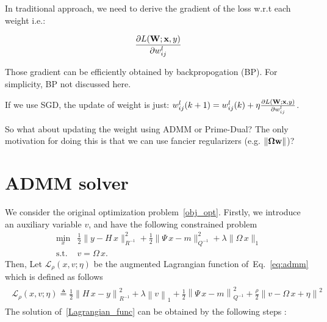 \documentclass[11pt,a4paper]{article}
\begin{document}
In traditional approach, we need to derive the gradient of the loss w.r.t each weight i.e.:

\begin{equation}
\frac{\partial L(\mathbf{W}; \mathbf{x}, y)}{\partial w^l_{ij}}
\end{equation}

Those gradient can be efficiently obtained by backpropogation (BP). For simplicity, BP not discussed here. 

If we use SGD, the update of weight is just: $w^l_{ij}(k+1) = w^l_{ij}(k) + \eta \frac{\partial L(\mathbf{W}; \mathbf{x}, y)}{\partial w^l_{ij}}$.

So what about updating the weight using ADMM or Prime-Dual? The only motivation for doing this is that we can use fancier regularizers (e.g. $\lVert\bm{\Omega} \mathbf{w}\rVert$)?

\section{ADMM solver}
We consider the original optimization problem~\eqref{obj_opt}. Firstly, we introduce an auxiliary variable $v$, and have the following constrained problem  
\begin{equation}\label{eq:admm}
\begin{split}
\min_{x} &\frac{1}{2} \| y - H \, x \|^2_{R^{-1}}
   + \frac{1}{2} \| \Psi \, x - m \|^2_{Q^{-1}} 
   + \lambda \|\Omega\, x \|_1  \\
\mathrm{s.t.}\ & v = \Omega\,x . 
\end{split}
\end{equation}
Then, Let $\mathcal{L_\rho}(x,v;\eta)$ be the augmented Lagrangian function of~Eq.~\eqref{eq:admm} which is defined as follows
\begin{equation}\label{Lagrangian_func}
\begin{split}
\begin{aligned}
\mathcal{L_\rho}(x,v;\eta) \triangleq  \frac{1}{2}  \left \|  H\,x-y \right \|_{R^{-1}}^2 + \lambda\left \| v \right \|_1 
+ \frac{1}{2} \left \| \Psi \, x - m\right\|_{ Q^{-1} }^2    
+ \frac{\rho}{2}\left \| v- \Omega \,x + \eta \right \|^2
\end{aligned}
\end{split}
\end{equation}
The solution of~\eqref{Lagrangian_func} can be obtained by the following steps \cite{Boyd2011ADMM}:
\end{document}
